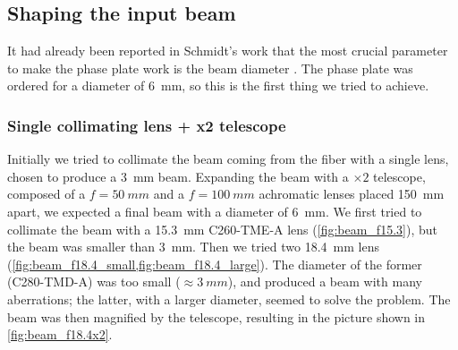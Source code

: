 \subsection{Shaping the input beam}
It had already been reported in Schmidt's work that the most crucial parameter to make the phase plate work is the beam diameter \cite{schmidt2021}. The phase plate was ordered for a diameter of \SI{6}{mm}, so this is the first thing we tried to achieve.

\subsubsection{Single collimating lens + x2 telescope}
Initially we tried to collimate the beam coming from the fiber with a single lens, chosen to produce a \SI{3}{mm} beam. Expanding the beam with a $\times 2$ telescope, composed of a $f=\SI{50}{mm}$ and a $f=\SI{100}{mm}$ achromatic lenses placed \SI{150}{mm} apart, we expected a final beam with a diameter of \SI{6}{mm}. We first tried to collimate the beam with a \SI{15.3}{mm} C260-TME-A lens (\cref{fig:beam_f15.3}), but the beam was smaller than \SI{3}{mm}. Then we tried two \SI{18.4}{mm} lens (\cref{fig:beam_f18.4_small,fig:beam_f18.4_large}). The diameter of the former (C280-TMD-A) was too small ($\approx \SI{3}{mm}$), and produced a beam with many aberrations; the latter, with a larger diameter, seemed to solve the problem. The beam was then magnified by the telescope, resulting in the picture shown in \cref{fig:beam_f18.4x2}.

